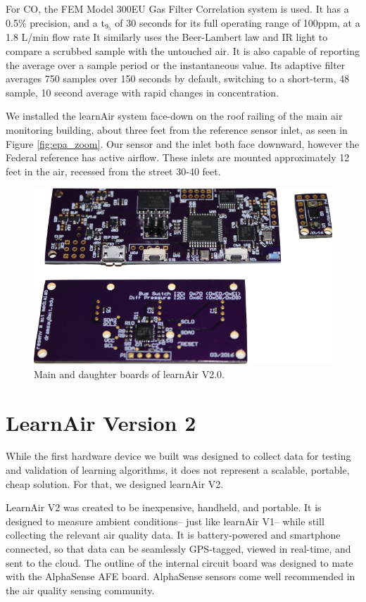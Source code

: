 For CO, the FEM Model 300EU Gas Filter Correlation system is used.  It has a 0.5\% precision, and a t$_9_5$ of 30 seconds for its full operating range of 100ppm, at a 1.8 L/min flow rate  It similarly uses the Beer-Lambert law and IR light to compare a scrubbed sample with the untouched air.  It is also capable of reporting the average over a sample period or the instantaneous value.  Its adaptive filter averages 750 samples over 150 seconds by default, switching to a short-term, 48 sample, 10 second average with rapid changes in concentration.     

We installed the learnAir system face-down on the roof railing of the main air monitoring building, about three feet from the reference sensor inlet, as seen in Figure \ref{fig:epa_zoom}.  Our sensor and the inlet both face downward, however the Federal reference has active airflow.  These inlets are mounted approximately 12 feet in the air, recessed from the street 30-40 feet.

\FloatBarrier
\begin{figure}[htb]
 	\includegraphics[width=\textwidth]{visuals/learnairV2_out}               
 	 \caption{Main and daughter boards of learnAir V2.0.}
  	\label{fig:learnairv2_out}
\end{figure}
\FloatBarrier
\section{LearnAir Version 2}
\FloatBarrier

While the first hardware device we built was designed to collect data for testing and validation of learning algorithms, it does not represent a scalable, portable, cheap solution.  For that, we designed learnAir V2.

LearnAir V2 was created to be inexpensive, handheld, and portable.  It is designed to measure ambient conditions-- just like learnAir V1-- while still collecting the relevant air quality data.  It is battery-powered and smartphone connected, so that data can be seamlessly GPS-tagged, viewed in real-time, and sent to the cloud.  The outline of the internal circuit board was designed to mate with the AlphaSense AFE board.  AlphaSense sensors come well recommended in the air quality sensing community.  

